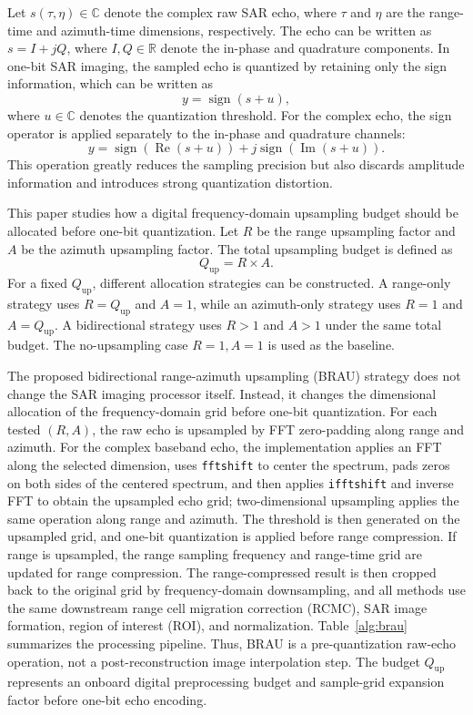 \documentclass[conference]{IEEEtran}
\begin{document}
Let $s(\tau,\eta)\in\mathbb{C}$ denote the complex raw SAR echo, where $\tau$ and $\eta$ are the range-time and azimuth-time dimensions, respectively. The echo can be written as $s=I+jQ$, where $I,Q\in\mathbb{R}$ denote the in-phase and quadrature components. In one-bit SAR imaging, the sampled echo is quantized by retaining only the sign information, which can be written as
\begin{equation}
    y = \operatorname{sign}(s + u),
\end{equation}
where $u\in\mathbb{C}$ denotes the quantization threshold. For the complex echo, the sign operator is applied separately to the in-phase and quadrature channels:
\begin{equation}
    y=\operatorname{sign}(\operatorname{Re}(s+u))
    +j\operatorname{sign}(\operatorname{Im}(s+u)).
\end{equation}
This operation greatly reduces the sampling precision but also discards amplitude information and introduces strong quantization distortion.

This paper studies how a digital frequency-domain upsampling budget should be allocated before one-bit quantization. Let $R$ be the range upsampling factor and $A$ be the azimuth upsampling factor. The total upsampling budget is defined as
\begin{equation}
    Q_{\mathrm{up}} = R \times A .
\end{equation}
For a fixed $Q_{\mathrm{up}}$, different allocation strategies can be constructed. A range-only strategy uses $R=Q_{\mathrm{up}}$ and $A=1$, while an azimuth-only strategy uses $R=1$ and $A=Q_{\mathrm{up}}$. A bidirectional strategy uses $R>1$ and $A>1$ under the same total budget. The no-upsampling case $R=1,A=1$ is used as the baseline.

The proposed bidirectional range-azimuth upsampling (BRAU) strategy does not change the SAR imaging processor itself. Instead, it changes the dimensional allocation of the frequency-domain grid before one-bit quantization. For each tested $(R,A)$, the raw echo is upsampled by FFT zero-padding along range and azimuth. For the complex baseband echo, the implementation applies an FFT along the selected dimension, uses \texttt{fftshift} to center the spectrum, pads zeros on both sides of the centered spectrum, and then applies \texttt{ifftshift} and inverse FFT to obtain the upsampled echo grid; two-dimensional upsampling applies the same operation along range and azimuth. The threshold is then generated on the upsampled grid, and one-bit quantization is applied before range compression. If range is upsampled, the range sampling frequency and range-time grid are updated for range compression. The range-compressed result is then cropped back to the original grid by frequency-domain downsampling, and all methods use the same downstream range cell migration correction (RCMC), SAR image formation, region of interest (ROI), and normalization. Table~\ref{alg:brau} summarizes the processing pipeline. Thus, BRAU is a pre-quantization raw-echo operation, not a post-reconstruction image interpolation step. The budget $Q_{\mathrm{up}}$ represents an onboard digital preprocessing budget and sample-grid expansion factor before one-bit echo encoding.
\end{document}
